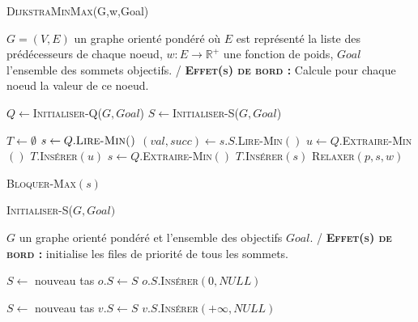 \begin{algorithm}
	\caption{\textsc {DijkstraMinMax}(G,w,Goal)}
	 \label{algo:dijkMinMax}
	\begin{algorithmic}[1]
		\REQUIRE $G = (V,E)$ un graphe orienté pondéré où $E$ est représenté la liste des prédécesseurs de chaque noeud, $w: E \rightarrow \mathbb{R}^{+}$ une fonction de poids, $Goal$ l'ensemble des sommets objectifs.
		\ENSURE / \textbf{\textsc{Effet(s) de bord :}} Calcule pour chaque noeud la valeur de ce noeud.
		
		\STATE $Q \leftarrow$\textsc{Initialiser-Q}($G,Goal$)
		\STATE $S \leftarrow$\textsc{Initialiser-S}($G,Goal$)
		
		\STATE $T \leftarrow \emptyset$
		 \label{lalgo:dijk4}
			\STATE $s \leftarrow Q.\textsc{Lire-Min()}$ \label{lalgo:dijk1}
			\STATE $(val,succ) \leftarrow s.S.$\textsc{Lire-Min}$()$ \label{lalgo:dijk6}
			 \label{lalgo:dijk7}
					\STATE $u \leftarrow Q.$\textsc{Extraire-Min}$()$
					\STATE $T.$\textsc{Insérer}$(u)$ \label{lalgo:dijk11}
			\ELSE \label{lalgo:dijk12}
				 \label{lalgo:dijk13}
					\STATE $s \leftarrow Q.$\textsc{Extraire-Min}$()$
					\STATE $T.$\textsc{Insérer}$(s)$
						\STATE \textsc{Relaxer}$(p,s,w)$ \label{lalgo:dijk2}
					\ENDFOR \label{lalgo:dijk18}
				
				
				\ELSE \label{lalgo:dijk19}
					\STATE \textsc{Bloquer-Max}$(s)$
				\ENDIF \label{lalgo:dijk21}
			\ENDIF\label{lalgo:dijk22}
		\ENDWHILE \label{lalgo:dijk23}
				
			
\end{algorithmic}
		
\end{algorithm}


\begin{algorithm}
	\caption{\textsc {Initialiser-S}($G,Goal)$}
	 \label{algo:initS}
	\begin{algorithmic}[1]
		\REQUIRE $G$ un graphe orienté pondéré et l'ensemble des objectifs $Goal$.
		\ENSURE / \textbf{\textsc{Effet(s) de bord :}} initialise les files de priorité de tous les sommets.
		
			\STATE $S \leftarrow$ nouveau tas
			\STATE $o.S \leftarrow S$
			\STATE $o.S.$\textsc{Insérer}$(0, NULL)$
		\ENDFOR
		
			\STATE $S \leftarrow$ nouveau tas
			\STATE $v.S \leftarrow S$
			\STATE $v.S.$\textsc{Insérer}$(+\infty, NULL)$
		\ENDFOR
		
	
			
\end{algorithmic}
		
\end{algorithm}

